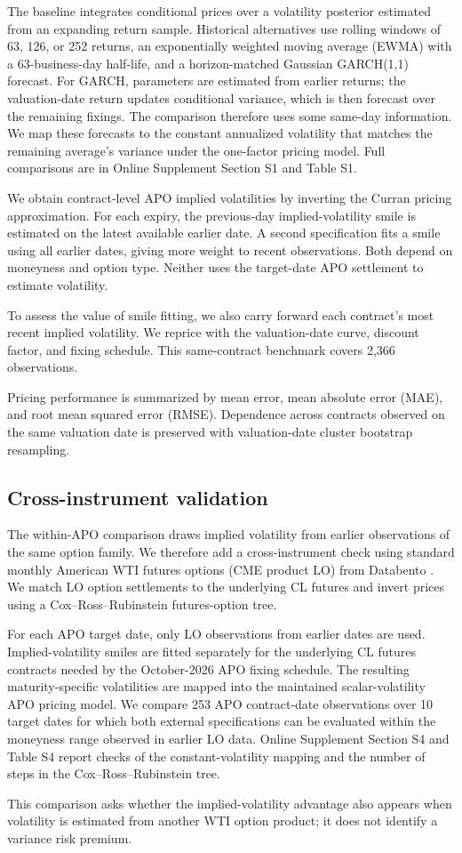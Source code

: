 The baseline integrates conditional prices over a volatility posterior estimated from an expanding return sample. Historical alternatives use rolling windows of 63, 126, or 252 returns, an exponentially weighted moving average (EWMA) with a 63-business-day half-life, and a horizon-matched Gaussian GARCH(1,1) forecast. For GARCH, parameters are estimated from earlier returns; the valuation-date return updates conditional variance, which is then forecast over the remaining fixings. The comparison therefore uses some same-day information. We map these forecasts to the constant annualized volatility that matches the remaining average's variance under the one-factor pricing model. Full comparisons are in Online Supplement Section S1 and Table S1.

We obtain contract-level APO implied volatilities by inverting the Curran pricing approximation. For each expiry, the previous-day implied-volatility smile is estimated on the latest available earlier date. A second specification fits a smile using all earlier dates, giving more weight to recent observations. Both depend on moneyness and option type. Neither uses the target-date APO settlement to estimate volatility.

To assess the value of smile fitting, we also carry forward each contract's most recent implied volatility. We reprice with the valuation-date curve, discount factor, and fixing schedule. This same-contract benchmark covers 2,366 observations.

Pricing performance is summarized by mean error, mean absolute error (MAE), and root mean squared error (RMSE). Dependence across contracts observed on the same valuation date is preserved with valuation-date cluster bootstrap resampling.

\subsection{Cross-instrument validation}

The within-APO comparison draws implied volatility from earlier observations of the same option family. We therefore add a cross-instrument check using standard monthly American WTI futures options (CME product LO) from Databento \citep{databentolocl2026}. We match LO option settlements to the underlying CL futures and invert prices using a Cox--Ross--Rubinstein futures-option tree.

For each APO target date, only LO observations from earlier dates are used. Implied-volatility smiles are fitted separately for the underlying CL futures contracts needed by the October-2026 APO fixing schedule. The resulting maturity-specific volatilities are mapped into the maintained scalar-volatility APO pricing model. We compare 253 APO contract-date observations over 10 target dates for which both external specifications can be evaluated within the moneyness range observed in earlier LO data. Online Supplement Section S4 and Table S4 report checks of the constant-volatility mapping and the number of steps in the Cox--Ross--Rubinstein tree.

This comparison asks whether the implied-volatility advantage also appears when volatility is estimated from another WTI option product; it does not identify a variance risk premium.
